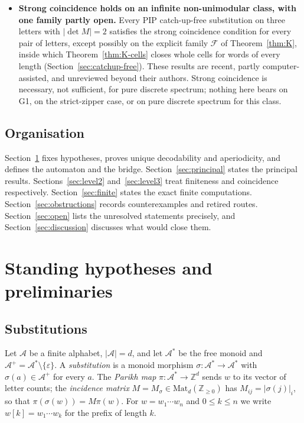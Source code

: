 \documentclass[11pt]{amsart}
\theoremstyle{plain}
\theoremstyle{definition}
\theoremstyle{remark}
\newcommand{\Z}{\mathbb{Z}}
\newcommand{\A}{\mathcal{A}}
\newcommand{\PDS}{pure discrete spectrum}
\begin{document}
\begin{itemize}[leftmargin=*]
\item \textbf{Strong coincidence holds on an infinite non-unimodular class, with one family partly open.} Every PIP catch-up-free substitution on three letters with $|\det M|=2$ satisfies the strong coincidence condition for every pair of letters, except possibly on the explicit family $\mathcal F$ of Theorem~\ref{thm:K}, inside which Theorem~\ref{thm:K-cells} closes whole cells for words of every length (Section~\ref{sec:catchup-free}). These results are recent, partly computer-assisted, and unreviewed beyond their authors. Strong coincidence is necessary, not sufficient, for \PDS{}; nothing here bears on G1, on the strict-zipper case, or on \PDS{} for this class.
\end{itemize}

\subsection{Organisation}
Section~\ref{sec:prelim} fixes hypotheses, proves unique decodability and aperiodicity, and defines the automaton and the bridge. Section~\ref{sec:principal} states the principal results. Sections~\ref{sec:level2} and~\ref{sec:level3} treat finiteness and coincidence respectively. Section~\ref{sec:finite} states the exact finite computations. Section~\ref{sec:obstructions} records counterexamples and retired routes. Section~\ref{sec:open} lists the unresolved statements precisely, and Section~\ref{sec:discussion} discusses what would close them.

\section{Standing hypotheses and preliminaries}\label{sec:prelim}

\subsection{Substitutions}
Let $\A$ be a finite alphabet, $|\A|=d$, and let $\A^*$ be the free monoid and $\A^+=\A^*\setminus\{\varepsilon\}$. A \emph{substitution} is a monoid morphism $\sigma:\A^*\to\A^*$ with $\sigma(a)\in\A^+$ for every $a$. The \emph{Parikh map} $\pi:\A^*\to\Z^d$ sends $w$ to its vector of letter counts; the \emph{incidence matrix} $M=M_\sigma\in\mathrm{Mat}_d(\Z_{\ge0})$ has $M_{ij}=|\sigma(j)|_i$, so that $\pi(\sigma(w))=M\pi(w)$. For $w=w_1\cdots w_n$ and $0\le k\le n$ we write $w[k]=w_1\cdots w_k$ for the prefix of length $k$.
\end{document}
